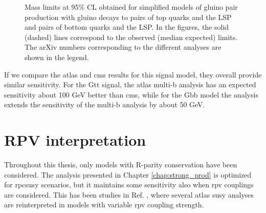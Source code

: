 \begin{figure}[htbp]
	\centering 
	\caption{Mass limits at 95\% CL obtained for simplified models of gluino pair production 
	with gluino decays to  pairs of top quarks and the LSP and 
	pairs of bottom quarks and the LSP. 
	In the figures, the solid (dashed) 
	lines correspond to the observed (median expected) limits. The arXiv numbers corresponding to the different analyses are shown in the legend.
	}
	\label{fig:limits_GbbGtt_comp}
\end{figure}

If we compare the \gls{atlas} and \gls{cms} results for this signal model, 
they overall provide similar sensitivity. 
For the Gtt signal, the \gls{atlas} multi-b analysis has an expected sensitivity about 100 GeV better than \gls{cms}, while 
for the Gbb model the \htmiss analysis extends the sensitivity of the multi-b analysis by about 50 GeV.

\FloatBarrier

\section{RPV interpretation}

Throughout this thesis, only models with R-parity conservation have been considered. 
The analysis presented in Chapter \ref{chap:strong_prod} is optimized for 
\gls{rpcsusy} scenarios, but it maintains some sensitivity also when \gls{rpv} couplings are considered. 
This has been studies in Ref. \cite{ATLAS-CONF-2018-003}, where several \gls{atlas} \gls{susy} analyses 
are reinterpreted in models with variable \gls{rpv} coupling strength.

